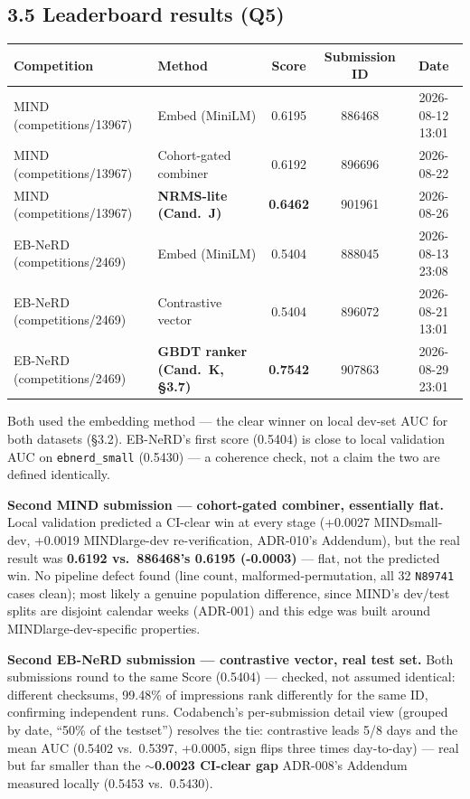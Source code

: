 \documentclass[10.5pt]{article}
\begin{document}
\subsection*{3.5 Leaderboard results (Q5)}
\vspace{-2pt}

{\footnotesize
\begin{tabular}{@{}llccc@{}}
\toprule
Competition & Method & Score & Submission ID & Date \\
\midrule
MIND (competitions/13967) & Embed (MiniLM) & 0.6195 & 886468 & 2026-08-12 13:01 \\
MIND (competitions/13967) & Cohort-gated combiner & 0.6192 & 896696 & 2026-08-22 \\
MIND (competitions/13967) & \textbf{NRMS-lite (Cand.\ J)} & \textbf{0.6462} & 901961 & 2026-08-26 \\
EB-NeRD (competitions/2469) & Embed (MiniLM) & 0.5404 & 888045 & 2026-08-13 23:08 \\
EB-NeRD (competitions/2469) & Contrastive vector & 0.5404 & 896072 & 2026-08-21 13:01 \\
EB-NeRD (competitions/2469) & \textbf{GBDT ranker (Cand.\ K, \S3.7)} & \textbf{0.7542} & 907863 & 2026-08-29 23:01 \\
\bottomrule
\end{tabular}\par}
\vspace{-3pt}

Both used the embedding method --- the clear winner on local dev-set AUC
for both datasets (\S3.2). EB-NeRD's first score (0.5404) is close to
local validation AUC on \texttt{ebnerd\_small} (0.5430) --- a coherence
check, not a claim the two are defined identically.

\textbf{Second MIND submission --- cohort-gated combiner, essentially
flat.} Local validation predicted a CI-clear win at every stage
(+0.0027 MINDsmall-dev, +0.0019 MINDlarge-dev re-verification, ADR-010's
Addendum), but the real result was \textbf{0.6192 vs.\ 886468's 0.6195
(-0.0003)} --- flat, not the predicted win. No pipeline defect found
(line count, malformed-permutation, all 32 \texttt{N89741} cases clean);
most likely a genuine population difference, since MIND's dev/test splits
are disjoint calendar weeks (ADR-001) and this edge was built around
MINDlarge-dev-specific properties.

\textbf{Second EB-NeRD submission --- contrastive vector, real test set.}
Both submissions round to the same Score (0.5404) --- checked, not
assumed identical: different checksums, 99.48\% of impressions rank
differently for the same ID, confirming independent runs. Codabench's
per-submission detail view (grouped by date, ``50\% of the testset'')
resolves the tie: contrastive leads 5/8 days and the mean AUC (0.5402
vs.\ 0.5397, +0.0005, sign flips three times day-to-day) --- real but far
smaller than the \textbf{$\sim$0.0023 CI-clear gap} ADR-008's Addendum
measured locally (0.5453 vs.\ 0.5430).
\end{document}
